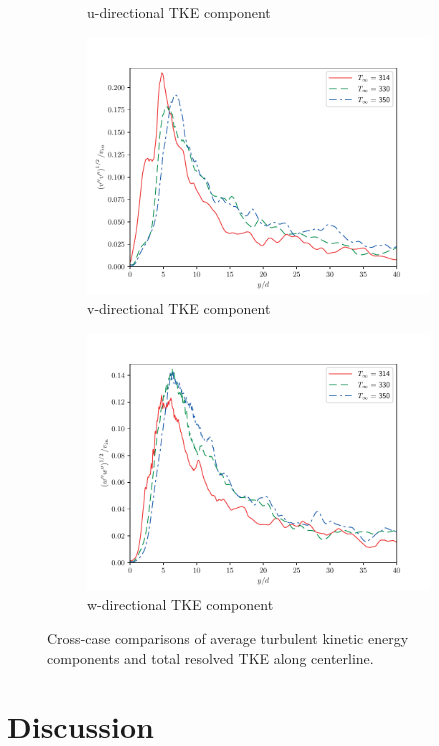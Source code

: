 \begin{figure}[H]
\begin{center}
\begin{subfigure}{0.45\textwidth}
	\caption{u-directional TKE component} \label{u_fa_1}
\end{subfigure}
\vfill
\begin{subfigure}{0.45\textwidth}
	\includegraphics[scale=.45]{figures/Plots/centerline/v_fa_centerline.pdf}
	\caption{v-directional TKE component} \label{v_fa_1}
\end{subfigure}
\begin{subfigure}{0.45\textwidth}
	\includegraphics[scale=.45]{figures/Plots/centerline/w_fa_centerline.pdf}
	\caption{w-directional TKE component} \label{w_fa_1}
\end{subfigure}
\caption{Cross-case comparisons of average turbulent kinetic energy components and total resolved TKE along centerline.}
\label{noniso_TKE_features}
\end{center}
\end{figure}



\section{Discussion}





